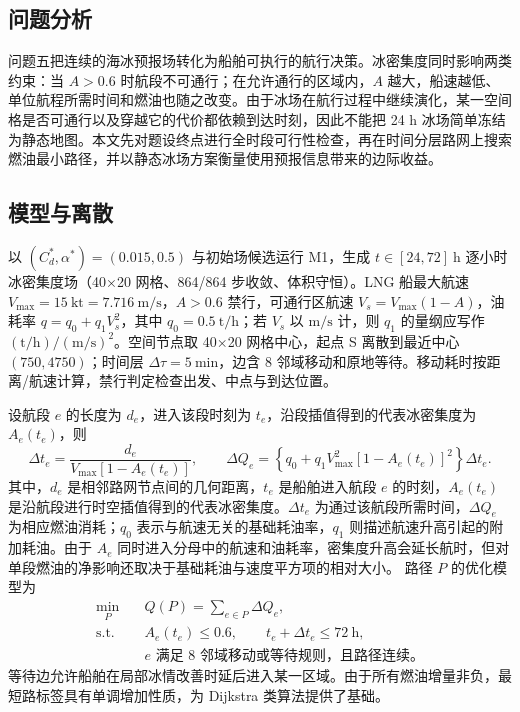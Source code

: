 \documentclass[UTF8]{ctexart}
\begin{document}
\subsection{问题分析}

问题五把连续的海冰预报场转化为船舶可执行的航行决策。冰密集度同时影响两类约束：当 $A>0.6$ 时航段不可通行；在允许通行的区域内，$A$ 越大，船速越低、单位航程所需时间和燃油也随之改变。由于冰场在航行过程中继续演化，某一空间格是否可通行以及穿越它的代价都依赖到达时刻，因此不能把 24 h 冰场简单冻结为静态地图。本文先对题设终点进行全时段可行性检查，再在时间分层路网上搜索燃油最小路径，并以静态冰场方案衡量使用预报信息带来的边际收益。

\subsection{模型与离散}

以 $(C_d^*,\alpha^*)=(0.015,0.5)$ 与初始场候选运行 M1，生成 $t\in[24,72]\ \mathrm h$ 逐小时冰密集度场（40×20 网格、864/864 步收敛、体积守恒）。LNG 船最大航速 $V_{\max}=15\ \mathrm{kt}=7.716\ \mathrm{m/s}$，$A>0.6$ 禁行，可通行区航速 $V_s=V_{\max}(1-A)$，油耗率 $q=q_0+q_1V_s^2$，其中 $q_0=0.5\ \mathrm{t/h}$；若 $V_s$ 以 $\mathrm{m/s}$ 计，则 $q_1$ 的量纲应写作 $(\mathrm{t/h})/(\mathrm{m/s})^2$。空间节点取 40×20 网格中心，起点 S 离散到最近中心 $(750,4750)$；时间层 $\Delta\tau=5\ \mathrm{min}$，边含 8 邻域移动和原地等待。移动耗时按距离/航速计算，禁行判定检查出发、中点与到达位置。

设航段 $e$ 的长度为 $d_e$，进入该段时刻为 $t_e$，沿段插值得到的代表冰密集度为 $A_e(t_e)$，则
\begin{equation}
\Delta t_e=\frac{d_e}{V_{\max}[1-A_e(t_e)]},
\qquad
\Delta Q_e=\left\{q_0+q_1V_{\max}^2[1-A_e(t_e)]^2\right\}\Delta t_e.
\end{equation}
其中，$d_e$ 是相邻路网节点间的几何距离，$t_e$ 是船舶进入航段 $e$ 的时刻，$A_e(t_e)$ 是沿航段进行时空插值得到的代表冰密集度。$\Delta t_e$ 为通过该航段所需时间，$\Delta Q_e$ 为相应燃油消耗；$q_0$ 表示与航速无关的基础耗油率，$q_1$ 则描述航速升高引起的附加耗油。由于 $A_e$ 同时进入分母中的航速和油耗率，密集度升高会延长航时，但对单段燃油的净影响还取决于基础耗油与速度平方项的相对大小。
路径 $P$ 的优化模型为
\begin{align}
\min_P\quad &Q(P)=\sum_{e\in P}\Delta Q_e,\\
\text{s.t.}\quad
&A_e(t_e)\le0.6,\qquad t_e+\Delta t_e\le72\ \mathrm h,\\
&e\text{ 满足 8 邻域移动或等待规则，且路径连续。}
\end{align}
等待边允许船舶在局部冰情改善时延后进入某一区域。由于所有燃油增量非负，最短路标签具有单调增加性质，为 Dijkstra 类算法提供了基础。
\end{document}
